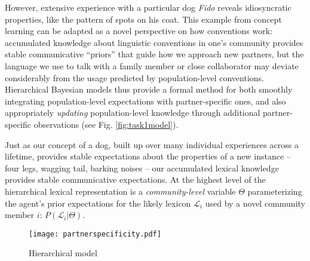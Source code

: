 
However, extensive experience with a particular dog \emph{Fido} reveals idiosyncratic properties, like the pattern of spots on his coat.
This example from concept learning can be adapted as a novel perspective on how conventions work: accumulated knowledge about linguistic conventions in one's community provides stable communicative ``priors'' that guide how we approach new partners, but the language we use to talk with a family member or close collaborator may deviate considerably from the usage predicted by population-level conventions.
Hierarchical Bayesian models thus provide a formal method for both smoothly integrating population-level expectations with partner-specific ones, and also appropriately \emph{updating} population-level knowledge through additional partner-specific observations (see Fig. \ref{fig:task1model}).

Just as our concept of a dog, built up over many individual experiences across a lifetime, provides stable expectations about the properties of a new instance -- four legs, wagging tail, barking noises -- our accumulated lexical knowledge provides stable communicative expectations. 
At the highest level of the hierarchical lexical representation is a \emph{community-level} variable $\Theta$ parameterizing the agent's prior expectations for the likely lexicon $\mathcal{L}_i$ used by a novel community member $i$: $P(\mathcal{L}_i | \Theta)$. 

\begin{figure}
\centering
    \texttt{[image: partnerspecificity.pdf]}
  \caption{Hierarchical model}
  \label{fig:specificity}
\end{figure}

